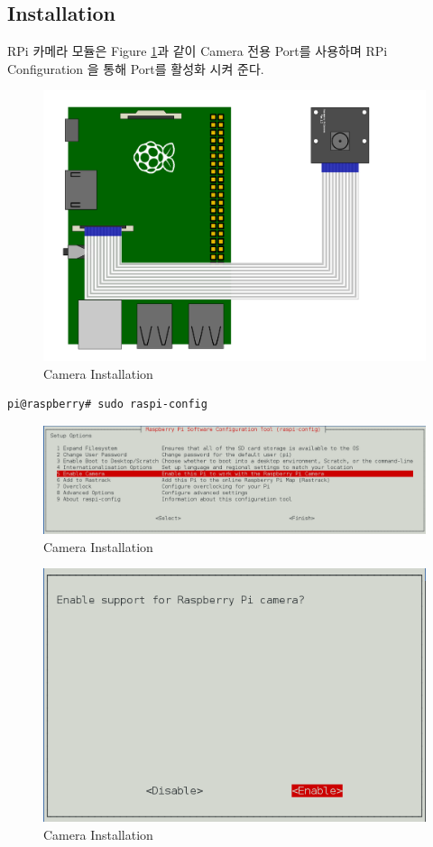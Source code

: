 \documentclass[11pt
  , a4paper
  , article
  , oneside
]{memoir}
\begin{document}
\subsection{Installation}
RPi 카메라 모듈은 Figure \ref{fig:ist_cam}과 같이 Camera 전용 Port를 사용하며 RPi Configuration
을 통해 Port를 활성화 시켜 준다.
\begin{figure}[!htb]
\centering
\includegraphics[width=1\textwidth]{./images/raspberry/pi_camera_setting.png}
\caption{Camera Installation}
\label{fig:ist_cam}
\end{figure}
\begin{lstlisting}[style=termstyle]
pi@raspberry# sudo raspi-config
\end{lstlisting}
\begin{figure}[!htb]
\centering
\includegraphics[width=1\textwidth]{./images/raspberry/enable_camera.png}
\caption{Camera Installation}
\label{fig:en_cam}
\end{figure}
\begin{figure}[!htb]
\centering
\includegraphics[width=1\textwidth]{./images/raspberry/enable_camera_sel.png}
\caption{Camera Installation}
\label{fig:sel_en_cam}
\end{figure}
\end{document}
